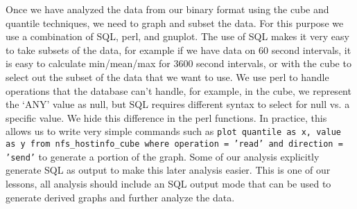 Once we have analyzed the data from our binary format using the cube
and quantile techniques, we need to graph and subset the data.  For
this purpose we use a combination of SQL, perl, and gnuplot.  The use
of SQL makes it very easy to take subsets of the data, for example if
we have data on 60 second intervals, it is easy to calculate
min/mean/max for 3600 second intervals, or with the cube to select out
the subset of the data that we want to use.  We use perl to handle
operations that the database can't handle, for example, in the cube,
we represent the `ANY' value as null, but SQL requires different
syntax to select for null vs. a specific value.  We hide this
difference in the perl functions.  In practice, this allows us to
write very simple commands such as {\tt plot quantile as x, value as y
from nfs\_hostinfo\_cube where operation = 'read' and direction =
'send'} to generate a portion of the graph.  Some of our analysis
explicitly generate SQL as output to make this later analysis easier.
This is one of our lessons, all analysis should include an SQL output
mode that can be used to generate derived graphs and further analyze
the data.
